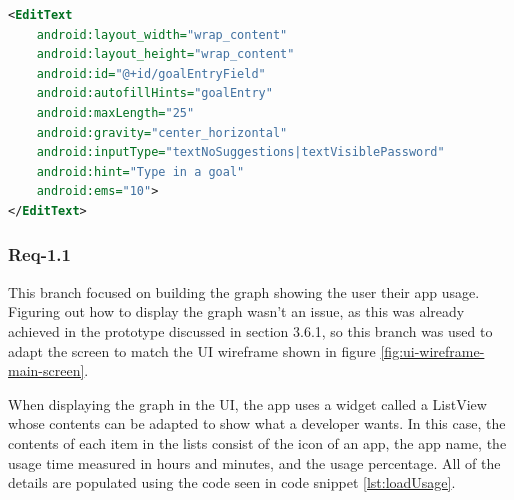 \documentclass[12pt]{article}
\begin{document}
\begin{lstlisting}[language=XML, style=mystyle, caption={XML code for the EditText widget}, label=lst:edittext]
 <EditText
	android:layout_width="wrap_content"
	android:layout_height="wrap_content"
	android:id="@+id/goalEntryField"
	android:autofillHints="goalEntry"
	android:maxLength="25"
	android:gravity="center_horizontal"
	android:inputType="textNoSuggestions|textVisiblePassword"
	android:hint="Type in a goal"
	android:ems="10">
</EditText>
\end{lstlisting}

\subsubsection{Req-1.1}
This branch focused on building the graph showing the user their app usage. Figuring out how to display the graph wasn't an issue, as this was already achieved in the prototype discussed in 
section 3.6.1, so this branch was used to adapt the screen to match the UI wireframe shown in figure \ref{fig:ui-wireframe-main-screen}. \newline

When displaying the graph in the UI, the app uses a widget called a ListView whose contents can be adapted to show what a developer wants. In this case, the contents of each item in the lists 
consist of the icon of an app, the app name, the usage time measured in hours and minutes, and the usage percentage. All of the details are populated using the code seen in code snippet
\ref{lst:loadUsage}.
\end{document}
